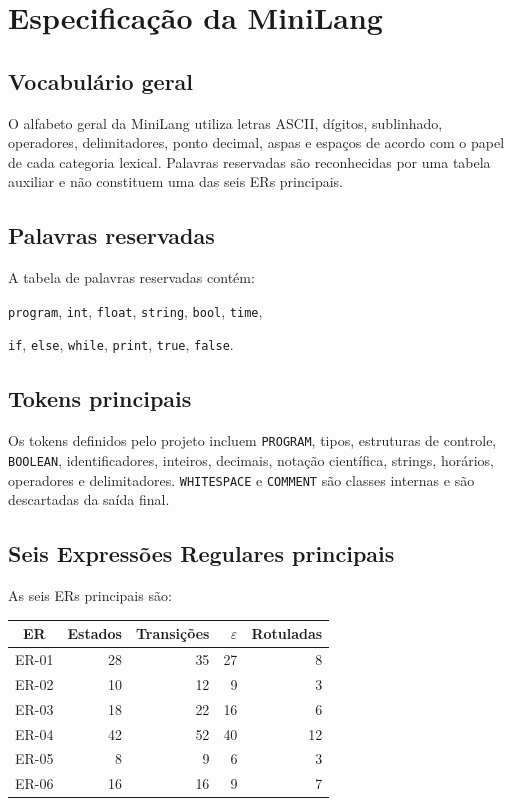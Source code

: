 \chapter{Especificação da MiniLang}

\section{Vocabulário geral}

O alfabeto geral da MiniLang utiliza letras ASCII, dígitos, sublinhado, operadores, delimitadores, ponto decimal, aspas e espaços de acordo com o papel de cada categoria lexical. Palavras reservadas são reconhecidas por uma tabela auxiliar e não constituem uma das seis ERs principais.

\section{Palavras reservadas}

A tabela de palavras reservadas contém:

\begin{center}
\texttt{program}, \texttt{int}, \texttt{float}, \texttt{string}, \texttt{bool}, \texttt{time},

\texttt{if}, \texttt{else}, \texttt{while}, \texttt{print}, \texttt{true}, \texttt{false}.
\end{center}

\section{Tokens principais}

Os tokens definidos pelo projeto incluem \texttt{PROGRAM}, tipos, estruturas de controle, \texttt{BOOLEAN}, identificadores, inteiros, decimais, notação científica, strings, horários, operadores e delimitadores. \texttt{WHITESPACE} e \texttt{COMMENT} são classes internas e são descartadas da saída final.

\section{Seis Expressões Regulares principais}

As seis ERs principais são:

\begin{center}
\small
\begin{tabular}{|c|r|r|r|r|}
\toprule
ER & Estados & Transições & $\varepsilon$ & Rotuladas \\
\midrule
ER-01 & 28 & 35 & 27 & 8 \\
ER-02 & 10 & 12 & 9 & 3 \\
ER-03 & 18 & 22 & 16 & 6 \\
ER-04 & 42 & 52 & 40 & 12 \\
ER-05 & 8 & 9 & 6 & 3 \\
ER-06 & 16 & 16 & 9 & 7 \\
\bottomrule
\end{tabular}
\end{center}


